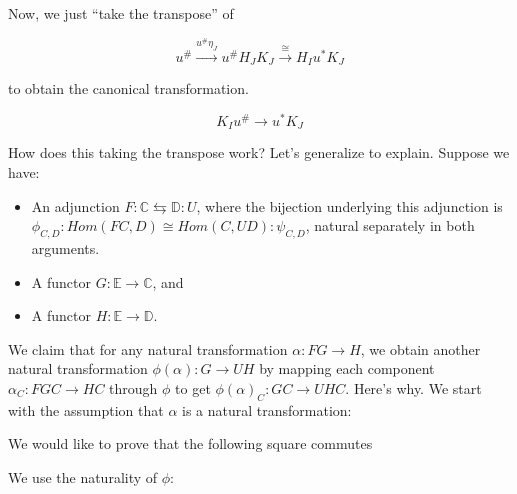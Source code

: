 \documentclass{article}
\begin{document}
Now, we just ``take the transpose'' of 

$$u^{\#} \overset{u^{\#}\eta_J}{\longrightarrow} u^{\#} H_J K_J \overset{\cong}{\longrightarrow} H_I u^* K_J $$

to obtain the canonical transformation.

$$K_I u^{\#} \to u^* K_J $$

How does this taking the transpose work? Let's generalize to explain.
Suppose we have:

\begin{itemize}
\item An adjunction $F : \mathbb C \leftrightarrows \mathbb D : U$, where the bijection underlying this adjunction
 is $\phi_{C,D} : Hom(FC,D) \cong Hom(C,UD) : \psi_{C,D}$, natural separately in both arguments.
\item A functor $G : \mathbb E \to \mathbb C$, and
\item A functor $H : \mathbb E \to \mathbb D$.
\end{itemize}

We claim that for any natural transformation $\alpha : FG \to H$, we obtain another natural transformation
$\phi(\alpha) : G \to UH$ by mapping each component $\alpha_C : FGC \to HC$ through $\phi$ to get 
$\phi(\alpha)_C : GC \to UHC$. Here's why. We start with the assumption that $\alpha$ is a natural transformation:

\begin{center}
\end{center}

We would like to prove that the following square commutes

\begin{center}
\end{center}

We use the naturality of $\phi$:
\end{document}
